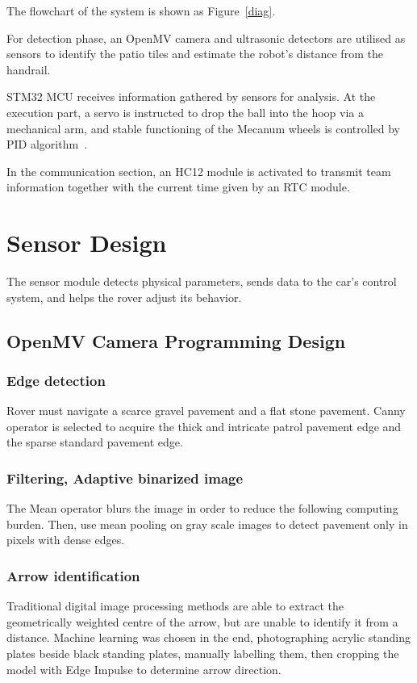 \documentclass{solutionclass} %
\begin{document}
The flowchart of the system is shown as Figure~\ref{diag}.

For detection phase, an OpenMV camera and ultrasonic detectors are utilised as sensors to identify the patio tiles and estimate the robot's distance from the handrail.

STM32 MCU receives information gathered by sensors for analysis. At the execution part, a servo is instructed to drop the ball into the hoop via a mechanical arm, and stable functioning of the Mecanum wheels is controlled by PID algorithm~\cite{pid}.

In the communication section, an HC12 module is activated to transmit team information together with the current time given by an RTC module.
\vspace{5cm}
\section{Sensor Design}
The sensor module detects physical parameters, sends data to the car's control system, and helps the rover adjust its behavior.

    \subsection*{OpenMV Camera Programming Design}
    
        \subsubsection{Edge detection}
        Rover must navigate a scarce gravel pavement and a flat stone pavement. Canny operator is selected to acquire the thick and intricate patrol pavement edge and the sparse standard pavement edge.
        
        \subsubsection{Filtering, Adaptive binarized image}
        The Mean operator blurs the image in order to reduce the following computing burden. Then, use mean pooling on gray scale images to detect pavement only in pixels with dense edges.
        
        \subsubsection{Arrow identification}
        Traditional digital image processing methods are able to extract the geometrically weighted centre of the arrow, but are unable to identify it from a distance. Machine learning was chosen in the end, photographing acrylic standing plates beside black standing plates, manually labelling them, then cropping the model with Edge Impulse to determine arrow direction.
        
\end{document}
